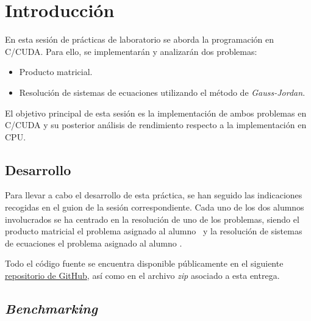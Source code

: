 \pagestyle{fancy}
\fancyhead[LO]{\autorR}
\fancyhead[LE]{\autorA}
\fancyhead[RE,RO]{\textit{\rightmark}}
\fancyfoot[L]{\asignaturaAbbr}
\fancyfoot[R]{\fecha}

\section{Introducción} \label{sec:1}
En esta sesión de prácticas de laboratorio se aborda la programación en C/CUDA. Para ello, se implementarán y analizarán 
dos problemas:
\vspace{0.1cm}
\begin{itemize}
    \item Producto matricial.
    \item Resolución de sistemas de ecuaciones utilizando el método de \textit{Gauss-Jordan}.
\end{itemize}
\vspace{0.1cm}
El objetivo principal de esta sesión es la implementación de ambos problemas en C/CUDA y su posterior análisis de rendimiento 
respecto a la implementación en CPU.

\subsection{Desarrollo}
Para llevar a cabo el desarrollo de esta práctica, se han seguido las indicaciones recogidas en el guion de la sesión correspondiente.
Cada uno de los dos alumnos involucrados se ha centrado en la resolución de uno de los problemas, 
siendo el producto matricial el problema asignado al alumno \autorR\ y la resolución de sistemas de ecuaciones el problema
asignado al alumno \autorA.

Todo el código fuente se encuentra disponible públicamente en el siguiente 
\href{https://github.com/alexrolo/CAP-CUDA}{repositorio de GitHub}, así como en el archivo \textit{zip} asociado a esta entrega.

\subsection{\textit{Benchmarking}}
